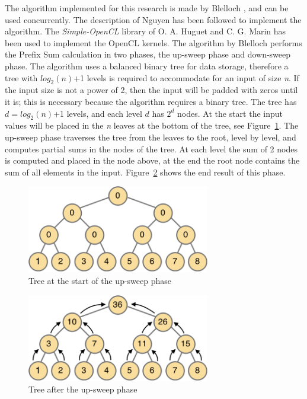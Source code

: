 \documentclass[a4paper]{article}
\begin{document}
The algorithm implemented for this research is made by Blelloch \cite{Blelloch:PrefixSum}, and can be used concurrently. The description of Nguyen \cite{Nguyen:GPUGems3} has been followed to implement the algorithm. The \emph{Simple-OpenCL} library \cite{Huguet:SimpleCL} of O. A. Huguet and C. G. Marin has been used to implement the OpenCL kernels. The algorithm by Blelloch performs the Prefix Sum calculation in two phases, the up-sweep phase and down-sweep phase. The algorithm uses a balanced binary tree for data storage, therefore a tree with $log_2(n)$+1 levels is required to accommodate for an input of size \emph{n}. If the input size is not a power of 2, then the input will be padded with zeros until it is; this is necessary because the algorithm requires a binary tree. The tree has $d=log_2(n)$+1 levels, and each level $d$ has $2^d$ nodes. At the start the input values will be placed in the \emph{n} leaves at the bottom of the tree, see Figure~\ref{treeStart}. The up-sweep phase traverses the tree from the leaves to the root, level by level, and computes partial sums in the nodes of the tree. At each level the sum of 2 nodes is computed and placed in the node above, at the end the root node contains the sum of all elements in the input. Figure~\ref{treeUpSweep} shows the end result of this phase.

\begin{figure}[htb!]
	\centering
	\includegraphics[width=80mm]{../images/tree-start.png}
	\caption{Tree at the start of the up-sweep phase}
	\label{treeStart}
\end{figure}

\begin{figure}[htb!]
	\centering
	\includegraphics[width=80mm]{../images/tree-upsweep.png}
	\caption{Tree after the up-sweep phase}
	\label{treeUpSweep}
\end{figure}
\end{document}
